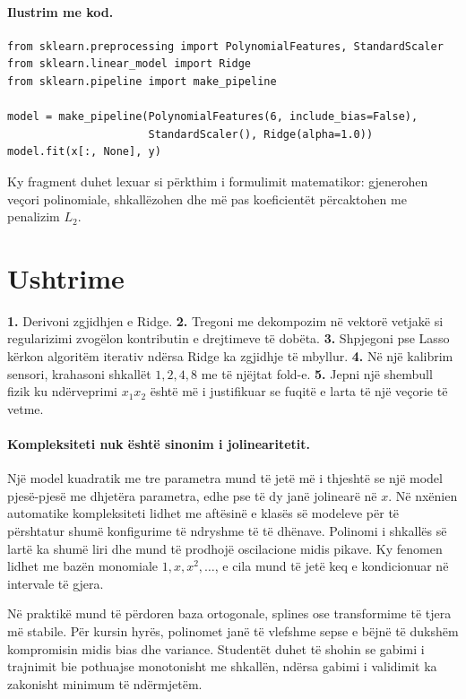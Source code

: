 \documentclass[12pt,a4paper,oneside]{book}
\begin{document}
\paragraph{Ilustrim me kod.}
\begin{lstlisting}
from sklearn.preprocessing import PolynomialFeatures, StandardScaler
from sklearn.linear_model import Ridge
from sklearn.pipeline import make_pipeline

model = make_pipeline(PolynomialFeatures(6, include_bias=False),
                      StandardScaler(), Ridge(alpha=1.0))
model.fit(x[:, None], y)
\end{lstlisting}
Ky fragment duhet lexuar si përkthim i formulimit matematikor: gjenerohen veçori polinomiale, shkallëzohen dhe më pas koeficientët përcaktohen me penalizim $L_2$.

\section{Ushtrime}

\textbf{1.} Derivoni zgjidhjen e Ridge. \textbf{2.} Tregoni me dekompozim në vektorë vetjakë si regularizimi zvogëlon kontributin e drejtimeve të dobëta. \textbf{3.} Shpjegoni pse Lasso kërkon algoritëm iterativ ndërsa Ridge ka zgjidhje të mbyllur. \textbf{4.} Në një kalibrim sensori, krahasoni shkallët $1,2,4,8$ me të njëjtat fold-e. \textbf{5.} Jepni një shembull fizik ku ndërveprimi $x_1x_2$ është më i justifikuar se fuqitë e larta të një veçorie të vetme.


\paragraph{Kompleksiteti nuk është sinonim i jolinearitetit.}
Një model kuadratik me tre parametra mund të jetë më i thjeshtë se një model pjesë-pjesë me dhjetëra parametra, edhe pse të dy janë jolinearë në $x$. Në nxënien automatike kompleksiteti lidhet me aftësinë e klasës së modeleve për të përshtatur shumë konfigurime të ndryshme të të dhënave. Polinomi i shkallës së lartë ka shumë liri dhe mund të prodhojë oscilacione midis pikave. Ky fenomen lidhet me bazën monomiale $1,x,x^2,\ldots$, e cila mund të jetë keq e kondicionuar në intervale të gjera.

Në praktikë mund të përdoren baza ortogonale, splines ose transformime të tjera më stabile. Për kursin hyrës, polinomet janë të vlefshme sepse e bëjnë të dukshëm kompromisin midis bias dhe variance. Studentët duhet të shohin se gabimi i trajnimit bie pothuajse monotonisht me shkallën, ndërsa gabimi i validimit ka zakonisht minimum të ndërmjetëm.
\end{document}
